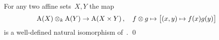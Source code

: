 \begin{proposition}
  \label{coordinate ring of product of affine sets}
  For any two affine sets~$X,Y$ the map
  \[
            \operatorname{A}(X) \mathbin{\otimes}_k \operatorname{A}(Y)
    \to     \operatorname{A}(X \times Y) \,,
    \quad   f \mathbin{\otimes} g
    \mapsto \bigl[ (x,y) \mapsto f(x)g(y) \bigr]
  \]
  is a well-defined natural isomorphism of~.
  \qed
\end{proposition}








